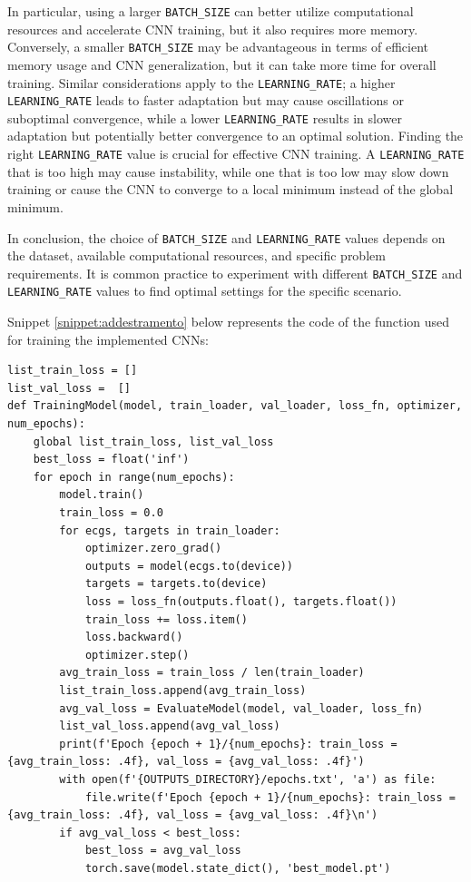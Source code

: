 \documentclass[12pt,english]{report}
\begin{document}
In particular, using a larger \texttt{BATCH\_SIZE} can better utilize computational resources and accelerate CNN training, but it also requires more memory. Conversely, a smaller \texttt{BATCH\_SIZE} may be advantageous in terms of efficient memory usage and CNN generalization, but it can take more time for overall training. Similar considerations apply to the \texttt{LEARNING\_RATE}; a higher \texttt{LEARNING\_RATE} leads to faster adaptation but may cause oscillations or suboptimal convergence, while a lower \texttt{LEARNING\_RATE} results in slower adaptation but potentially better convergence to an optimal solution. Finding the right \texttt{LEARNING\_RATE} value is crucial for effective CNN training. A \texttt{LEARNING\_RATE} that is too high may cause instability, while one that is too low may slow down training or cause the CNN to converge to a local minimum instead of the global minimum.

In conclusion, the choice of \texttt{BATCH\_SIZE} and \texttt{LEARNING\_RATE} values depends on the dataset, available computational resources, and specific problem requirements. It is common practice to experiment with different \texttt{BATCH\_SIZE} and \texttt{LEARNING\_RATE} values to find optimal settings for the specific scenario.

Snippet \ref{snippet:addestramento} below represents the code of the function used for training the implemented CNNs:

\lstset{language=Python}
\begin{lstlisting}[aboveskip=15pt, belowskip=15pt, basicstyle=\fontsize{8}{10}\selectfont, keywordstyle=\color{blue}, breaklines=true, label=snippet:addestramento]
list_train_loss = []
list_val_loss =  []
def TrainingModel(model, train_loader, val_loader, loss_fn, optimizer, num_epochs):
    global list_train_loss, list_val_loss
    best_loss = float('inf')
    for epoch in range(num_epochs):
        model.train()
        train_loss = 0.0
        for ecgs, targets in train_loader:
            optimizer.zero_grad()
            outputs = model(ecgs.to(device))
            targets = targets.to(device)
            loss = loss_fn(outputs.float(), targets.float())
            train_loss += loss.item()
            loss.backward()
            optimizer.step()
        avg_train_loss = train_loss / len(train_loader)
        list_train_loss.append(avg_train_loss)
        avg_val_loss = EvaluateModel(model, val_loader, loss_fn)
        list_val_loss.append(avg_val_loss)
        print(f'Epoch {epoch + 1}/{num_epochs}: train_loss = {avg_train_loss: .4f}, val_loss = {avg_val_loss: .4f}')
        with open(f'{OUTPUTS_DIRECTORY}/epochs.txt', 'a') as file:
            file.write(f'Epoch {epoch + 1}/{num_epochs}: train_loss = {avg_train_loss: .4f}, val_loss = {avg_val_loss: .4f}\n')
        if avg_val_loss < best_loss:
            best_loss = avg_val_loss
            torch.save(model.state_dict(), 'best_model.pt')
\end{lstlisting}
\end{document}

